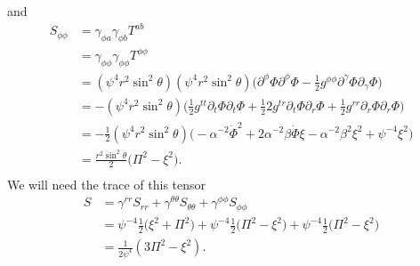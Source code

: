 \documentclass[12pt]{article}
\numberwithin{equation}{section}
\begin{document}
and
\begin{equation} \label{eq:S_phiphi}
\begin{aligned}
S_{\phi \phi} &= \gamma_{\phi a} \gamma_{\phi b} T^{ab} \\
&= \gamma_{\phi \phi} \gamma_{\phi \phi} T^{\phi \phi} \\
&= (\psi^4 r^2 \sin^2 \theta) (\psi^4 r^2 \sin^2 \theta) \Big( \partial^\phi \Phi \partial^\phi \Phi - \frac{1}{2} g^{\phi \phi} \partial^\gamma \Phi \partial_\gamma \Phi  \Big) \\
&= - (\psi^4 r^2 \sin^2 \theta) \Big( \frac{1}{2} g^{t t} \partial_t \Phi \partial_t \Phi + \frac{1}{2} 2 g^{t r} \partial_t \Phi \partial_r \Phi + \frac{1}{2} g^{r r} \partial_r \Phi \partial_r \Phi \Big) \\
&= - \frac{1}{2} (\psi^4 r^2 \sin^2 \theta) \Big( -\alpha^{-2} \dot{\Phi}^2 + 2 \alpha^{-2} \beta \dot{\Phi} \xi - \alpha^{-2} \beta^2 \xi^2 + \psi^{-4} \xi^2 \Big) \\
&= \frac{r^2 \sin^2 \theta}{2} \Big( \Pi^2 - \xi^2 \Big). \\
\end{aligned}
\end{equation}
We will need the trace of this tensor
\begin{equation}
\begin{aligned}
S &= \gamma^{rr} S_{rr} + \gamma^{\theta \theta} S_{\theta \theta} + \gamma^{\phi \phi} S_{\phi \phi} \\
&= \psi^{-4} \frac{1}{2} \Big( \xi^2 + \Pi^2 \Big) + \psi^{-4} \frac{1}{2} \Big( \Pi^2 - \xi^2 \Big) + \psi^{-4} \frac{1}{2} \Big( \Pi^2 - \xi^2 \Big) \\
&= \frac{1}{2 \psi^{4}} ( 3 \Pi^2 - \xi^2). \\
\end{aligned}
\end{equation}
\end{document}
